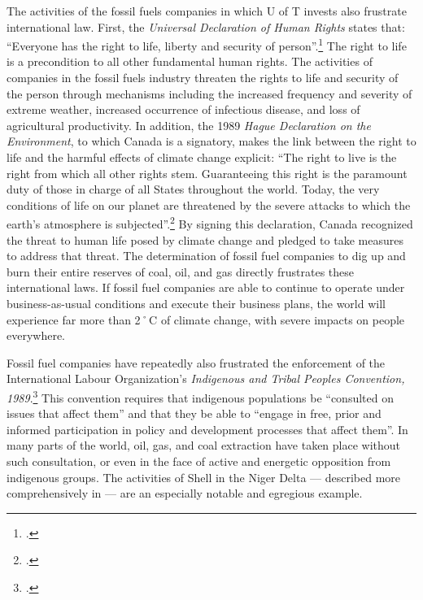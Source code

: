 \documentclass[10pt]{article}
\begin{document}
The activities of the fossil fuels companies in which U of T invests also frustrate international law.  
First, the \emph{Universal Declaration of Human Rights} states that: ``Everyone has the right to life, liberty and security of person''.\footcite[][]{UniversalDeclarationOfHumanRights}
The right to life is a precondition to all other fundamental human rights.  
The activities of companies in the fossil fuels industry threaten the rights to life and security of the person through mechanisms including the increased frequency and severity of extreme weather, increased occurrence of infectious disease, and loss of  agricultural productivity.
In addition, the 1989 \emph{Hague Declaration on the Environment}, to which Canada is a signatory, makes the link between the right to life and the harmful effects of climate change explicit: ``The right to live is the right from which all other rights stem. Guaranteeing this right is the paramount duty of those in charge of all States throughout the world.  Today, the very conditions of life on our planet are threatened by the severe attacks to which the earth's atmosphere is subjected''.\footcite[][]{HagueDeclarationOnTheEnvironment}   
By signing this declaration, Canada recognized the threat to human life posed by climate change and pledged to take measures to address that threat.
The determination of fossil fuel companies to dig up and burn their entire reserves of coal, oil, and gas directly frustrates these international laws.
If fossil fuel companies are able to continue to operate under business-as-usual conditions and execute their business plans, the world will experience far more than 2˚C of climate change, with severe impacts on people everywhere.



Fossil fuel companies have repeatedly also frustrated the enforcement of the International Labour Organization's \emph{Indigenous and Tribal Peoples Convention, 1989}.\footcite[][]{ILOConv169}
This convention requires that indigenous populations be ``consulted on issues that affect them'' and that they be able to ``engage in free, prior and informed participation in policy and development processes that affect them''.
In many parts of the world, oil, gas, and coal extraction have taken place without such consultation, or even in the face of active and energetic opposition from indigenous groups.
The activities of Shell in the Niger Delta --- described more comprehensively in  --- are an especially notable and egregious example.
\end{document}
